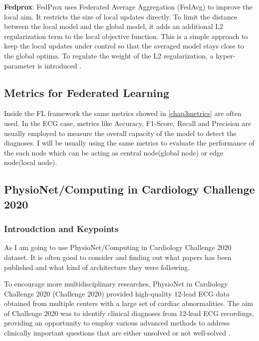 \textbf{Fedprox}: FedProx uses Federated Average Aggregation (FedAvg) to improve the local aim. It restricts the size of local updates directly. To limit the distance between the local model and the global model, it adds an additional L2 regularization term to the local objective function. This is a simple approach to keep the local updates under control so that the averaged model stays close to the global optima. To regulate the weight of the L2 regularization, a hyper-parameter is introduced \cite{fl19}.

\subsection{Metrics for Federated Learning}

Inside the FL framework the same metrics showed in \ref{chap3metrics} are often used. In the ECG case, metrics like Accuracy, F1-Score, Recall and Precision are usually employed to measure the overall capacity of the model to detect the diagnoses. I will be usually using the same metrics to evaluate the performance of the each node which can be acting as central node(global node) or edge node(local node). 


\subsection{PhysioNet/Computing in Cardiology Challenge 2020}

\subsubsection{Introudction and Keypoints}

As I am going to use \cite{physionet_challenge_2020} PhysioNet/Computing in Cardiology Challenge 2020 dataset. It is often good to consider and finding out what papers has been published and what kind of architecture they were following. 

\cite{main_arythmia_detection}To encourage more multidisciplinary researches, PhysioNet in Cardiology Challenge 2020 (Challenge 2020) \cite{physionet_challenge_2020} provided high-quality 12-lead ECG data obtained from multiple centers with a large set of cardiac abnormalities. The aim of Challenge 2020 was to identify clinical diagnoses from 12-lead ECG recordings, providing an opportunity to employ various advanced methods to address clinically important questions that are either unsolved or not well-solved \cite{arythmia_detection_9}.

